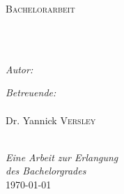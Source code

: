 \documentclass[
captions=nooneline,
11pt, %
ngerman, %
singlespacing, %
headsepline, %
]{MastersDoctoralThesis} %
\author{Dennis \textsc{Ulmer}} %
\begin{document}
\frontmatter %

\pagestyle{plain} %


\begin{titlepage}
\begin{center}

{\scshape\LARGE \univname\par}\vspace{1.5cm} %
\textsc{\Large Bachelorarbeit}\\[0.5cm] %

\HRule \\[0.4cm] %
{\huge \bfseries \ttitle\par}\vspace{0.4cm} %
\HRule \\[1.5cm] %

\begin{minipage}[t]{0.4\textwidth}
\begin{flushleft} \large
\emph{Autor:}\\
{\authorname} %
\end{flushleft}
\end{minipage}
\begin{minipage}[t]{0.4\textwidth}
\begin{flushright} \large
\emph{Betreuende:} \\
{\supname\\Dr. Yannick \textsc{Versley}} %
\end{flushright}
\end{minipage}\\[3cm]

\large \textit{Eine Arbeit zur Erlangung \\ des Bachelorgrades}\\[0.3cm] %

{\large \today}\\[4cm] %

\vfill
\end{center}
\end{titlepage}
\end{document}
